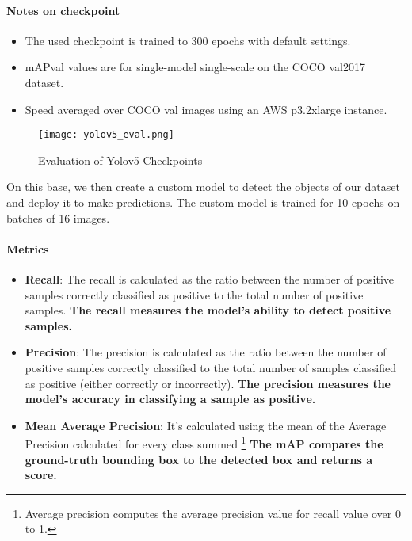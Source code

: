 \paragraph{Notes on checkpoint}
\begin{itemize}
    \item The used checkpoint is trained to 300 epochs with default settings.
    \item mAPval values are for single-model single-scale on the COCO val2017 dataset.
    \item Speed averaged over COCO val images using an AWS p3.2xlarge instance.
\end{itemize}

\begin{figure}[h!]
    \centering
  \texttt{[image: yolov5\_eval.png]}
  \caption{Evaluation of Yolov5 Checkpoints}
  \label{fig:evalyolockp}
\end{figure}

On this base, we then create a custom model to detect the objects of our dataset and deploy it to make predictions. The custom model is trained for 10 epochs on batches of 16 images.

\paragraph{Metrics}
\begin{itemize}
    \item \textbf{Recall}: The recall is calculated as the ratio between the number of positive samples correctly classified as positive to the total number of positive samples. \textbf{The recall measures the model's ability to detect positive samples.}
    \item \textbf{Precision}: The precision is calculated as the ratio between the number of positive samples correctly classified to the total number of samples classified as positive (either correctly or incorrectly). \textbf{The precision measures the model's accuracy in classifying a sample as positive.}
    \item \textbf{Mean Average Precision}: It’s calculated using the mean of the Average Precision calculated for every class summed \footnote{Average precision computes the average precision value for recall value over 0 to 1.}
    \textbf{The mAP compares the ground-truth bounding box to the detected box and returns a score.}
\end{itemize}

